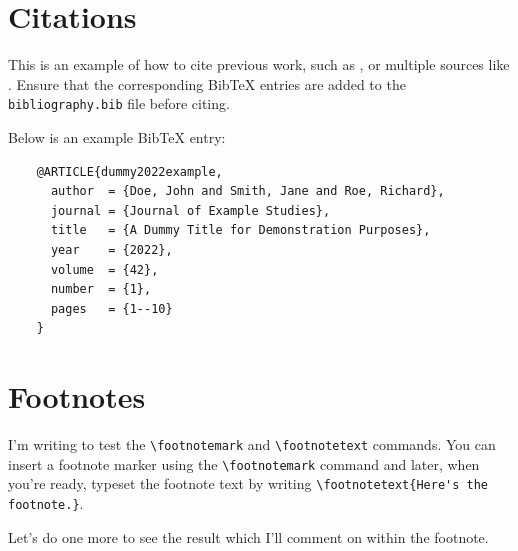 \section{Citations}
\begin{paragraph}
This is an example of how to cite previous work, such as \cite{min2net}, or multiple sources like \cite{hu79, somework2020, tonio_paper}. Ensure that the corresponding BibTeX entries are added to the \texttt{bibliography.bib} file before citing.

Below is an example BibTeX entry:

\begin{verbatim}
    @ARTICLE{dummy2022example,
      author  = {Doe, John and Smith, Jane and Roe, Richard},
      journal = {Journal of Example Studies}, 
      title   = {A Dummy Title for Demonstration Purposes}, 
      year    = {2022},
      volume  = {42},
      number  = {1},
      pages   = {1--10}
    }
    \end{verbatim}

\end{paragraph}

\section{Footnotes}

I'm writing to test the \verb|\footnotemark| and \verb|\footnotetext| commands. 
You can insert a footnote marker using the \verb|\footnotemark|\footnotemark{}
command and later, when you're ready, typeset the footnote text by writing 
\verb|\footnotetext{Here's the footnote.}|. 

Let's do one more to see the result\footnotemark{} which I'll comment on within the
footnote.
